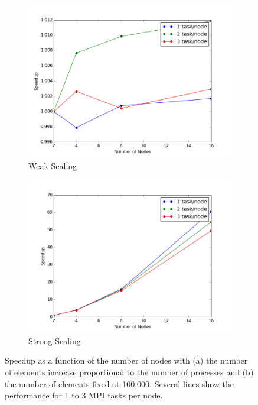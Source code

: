 \documentclass[10pt]{article}
\begin{document}
\begin{figure}[H]
        \centering
        \begin{subfigure}[b]{0.5\textwidth}
                \centering
                \includegraphics[width=\textwidth]{../figures/weak-mpi.png}
                \caption{Weak Scaling}
        \end{subfigure}%
                \begin{subfigure}[b]{0.5\textwidth}
                \centering
                \includegraphics[width=\textwidth]{../figures/strong-mpi.png}
                \caption{Strong Scaling}
        \end{subfigure}%
\caption{Speedup as a function of the number of nodes with (a) the number of elements increase proportional to the number of processes and (b) the number of elements fixed at 100,000. Several lines show the performance for 1 to 3 MPI tasks per node.}
        \label{fig:scalingMPI}
\end{figure}
\end{document}
